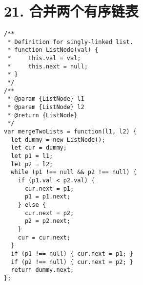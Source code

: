 \newpage
\section{21. 合并两个有序链表}
\label{leetcode:21}

\begin{verbatim}
/**
 * Definition for singly-linked list.
 * function ListNode(val) {
 *     this.val = val;
 *     this.next = null;
 * }
 */
/**
 * @param {ListNode} l1
 * @param {ListNode} l2
 * @return {ListNode}
 */
var mergeTwoLists = function(l1, l2) {
  let dummy = new ListNode();
  let cur = dummy;
  let p1 = l1;
  let p2 = l2;
  while (p1 !== null && p2 !== null) {
    if (p1.val < p2.val) {
      cur.next = p1;
      p1 = p1.next;
    } else {
      cur.next = p2;
      p2 = p2.next;
    }
    cur = cur.next;
  }
  if (p1 !== null) { cur.next = p1; }
  if (p2 !== null) { cur.next = p2; }
  return dummy.next;
};
\end{verbatim}
